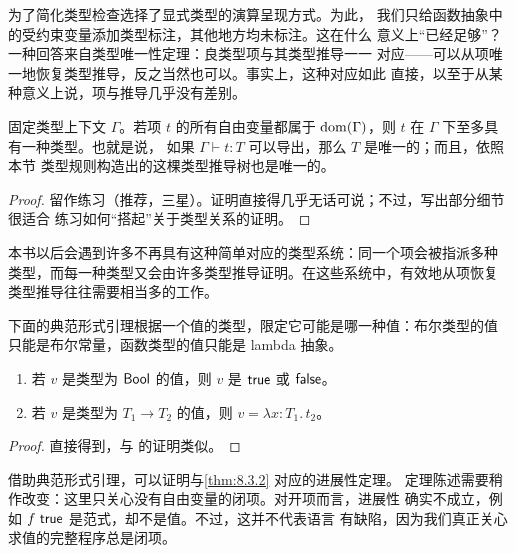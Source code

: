  为了简化类型检查选择了显式类型的演算呈现方式。为此，
我们只给函数抽象中的受约束变量添加类型标注，其他地方均未标注。这在什么
意义上“已经足够”？一种回答来自类型唯一性定理：良类型项与其类型推导一一
对应——可以从项唯一地恢复类型推导，反之当然也可以。事实上，这种对应如此
直接，以至于从某种意义上说，项与推导几乎没有差别。

\begin{theorem}[类型的唯一性]
\label{thm:9.3.3}
固定类型上下文 \(\Gamma\)。若项 \(t\) 的所有自由变量都属于
\(\operatorname{dom}(\Gamma)\)，则 \(t\) 在 \(\Gamma\) 下至多具有一种类型。也就是说，
如果 \(\Gamma\vdash t:T\) 可以导出，那么 \(T\) 是唯一的；而且，依照本节
类型规则构造出的这棵类型推导树也是唯一的。
\end{theorem}

\begin{proof}
留作练习（推荐，三星）。证明直接得几乎无话可说；不过，写出部分细节很适合
练习如何“搭起”关于类型关系的证明。
\end{proof}

本书以后会遇到许多不再具有这种简单对应的类型系统：同一个项会被指派多种
类型，而每一种类型又会由许多类型推导证明。在这些系统中，有效地从项恢复
类型推导往往需要相当多的工作。

下面的典范形式引理根据一个值的类型，限定它可能是哪一种值：布尔类型的值
只能是布尔常量，函数类型的值只能是 lambda 抽象。

\taplstatementliststart
\begin{lemma}[典范形式]
\label{lem:9.3.4}
\taplstatementlistbreak
\begin{enumerate}
  \item 若 \(v\) 是类型为 \(\mathsf{Bool}\) 的值，则 \(v\) 是
    \(\mathsf{true}\) 或 \(\mathsf{false}\)。
  \item 若 \(v\) 是类型为 \(T_1\to T_2\) 的值，则
    \(v=\lambda x:T_1.\,t_2\)。
\end{enumerate}
\end{lemma}

\begin{proof}
直接得到，与
的证明类似。
\end{proof}

借助典范形式引理，可以证明与\cref{thm:8.3.2} 对应的进展性定理。
定理陈述需要稍作改变：这里只关心没有自由变量的闭项。对开项而言，进展性
确实不成立，例如 \(f\ \mathsf{true}\) 是范式，却不是值。不过，这并不代表语言
有缺陷，因为我们真正关心求值的完整程序总是闭项。

